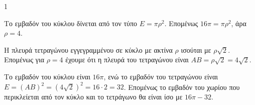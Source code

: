 \begin{ylh}{1}
    \item [Γεωμετρία: Εμβαδόν κύκλου, ιδιότητες εγγεγραμμένου τετραγώνου.]
\end{ylh}
\begin{figure} %
\end{figure}
\begin{alist}
    \item Το εμβαδόν του κύκλου δίνεται από τον τύπο $E = \pi \rho^2$. Επομένως $16\pi = \pi \rho^2$, άρα $\rho = 4$.
    \item
    \begin{rlist}
        \item Η πλευρά τετραγώνου εγγεγραμμένου σε κύκλο με ακτίνα $\rho$ ισούται με $\rho \sqrt{2}$. Επομένως για $\rho = 4$ έχουμε ότι η πλευρά του τετραγώνου είναι $AB = \rho \sqrt{2} = 4\sqrt{2}$.
        \item Το εμβαδόν του κύκλου είναι $16\pi$, ενώ το εμβαδόν του τετραγώνου είναι $E = (AB)^2 = (4\sqrt{2})^2 = 16 \cdot 2 = 32$. Επομένως το εμβαδόν του χωρίου που περικλείεται από τον κύκλο και το τετράγωνο θα είναι ίσο με $16\pi - 32$.
    \end{rlist}
\end{alist}